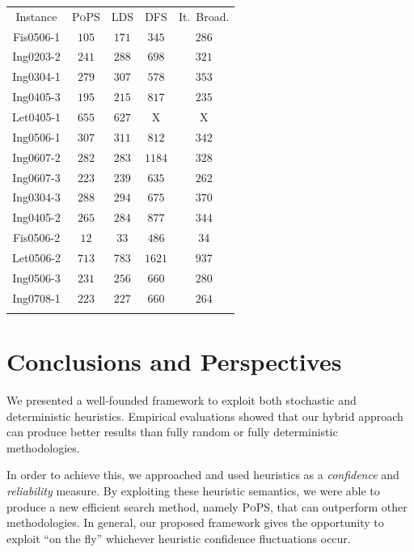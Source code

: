 \documentclass{ws-ijait}
\begin{document}
\begin{table}
  {\begin{tabular}{ccccc}
    \toprule
              Instance & \textsc{PoPS} & LDS & DFS & It.\ Broad. \\
    \colrule
    \textsf{Fis0506-1} & $\mathit{105}$ & $171$ &  $345$ & $286$ \\
    \textsf{Ing0203-2} & $\mathit{241}$ & $288$ &  $698$ & $321$ \\
    \textsf{Ing0304-1} & $\mathit{279}$ & $307$ &  $578$ & $353$ \\
    \textsf{Ing0405-3} & $\mathit{195}$ & $215$ &  $817$ & $235$ \\
    \textsf{Let0405-1} & $655$ & $\mathit{627}$ &    X   &   X   \\
    \textsf{Ing0506-1} & $\mathit{307}$ & $311$ &  $812$ & $342$ \\
    \textsf{Ing0607-2} & $\mathit{282}$ & $283$ & $1184$ & $328$ \\
    \textsf{Ing0607-3} & $\mathit{223}$ & $239$ &  $635$ & $262$ \\
    \textsf{Ing0304-3} & $\mathit{288}$ & $294$ &  $675$ & $370$ \\
    \textsf{Ing0405-2} & $\mathit{265}$ & $284$ &  $877$ & $344$ \\
    \textsf{Fis0506-2} &  $\mathit{12}$ &  $33$ &  $486$ &  $34$ \\
    \textsf{Let0506-2} & $\mathit{713}$ & $783$ & $1621$ & $937$ \\
    \textsf{Ing0506-3} & $\mathit{231}$ & $256$ &  $660$ & $280$ \\
    \textsf{Ing0708-1} & $\mathit{223}$ & $227$ &  $660$ & $264$ \\
    \botrule
  \end{tabular}}
\end{table}


\section{Conclusions and Perspectives}

We presented a well-founded framework to exploit both
stochastic and deterministic heuristics. Empirical
evaluations showed that our hybrid approach can produce
better results than fully random or fully deterministic
methodologies.

In order to achieve this, we approached and used heuristics
as a \emph{confidence} and \emph{reliability} measure. By
exploiting these heuristic semantics, we were able to
produce a new efficient search method, namely \textsc{PoPS},
that can outperform other methodologies. In general, our
proposed framework gives the opportunity to exploit ``on the
fly'' whichever heuristic confidence fluctuations occur.
\end{document}

